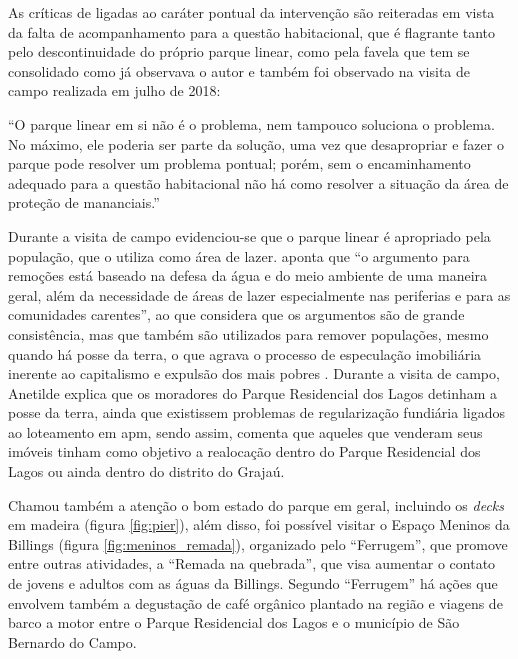	As críticas de  ligadas ao caráter pontual da intervenção são reiteradas em vista da falta de acompanhamento para a questão habitacional, que é flagrante tanto pelo descontinuidade do próprio parque linear, como pela favela que tem se consolidado como já observava o autor e também foi observado na visita de campo realizada em julho de 2018:
	
	\begin{citacao}
		``O parque linear em si não é o problema, nem tampouco soluciona o problema. No máximo, ele poderia ser parte da solução, uma vez que desapropriar e fazer o parque pode resolver um problema pontual; porém, sem o encaminhamento adequado para a questão habitacional não há como resolver a situação da área de proteção de mananciais.''
	\end{citacao}
	
	Durante a visita de campo evidenciou-se que o parque linear é apropriado pela população, que o utiliza como área de lazer.  aponta que ``o argumento para remoções está baseado na defesa da água e do meio ambiente de uma maneira geral, além da necessidade de áreas de lazer especialmente nas periferias e para as comunidades carentes'', ao que considera que os argumentos são de grande consistência, mas que também são utilizados para remover populações, mesmo quando há posse da terra, o que agrava o processo de especulação imobiliária inerente ao capitalismo e expulsão dos mais pobres \cite[p.118]{Silva2016}. Durante a visita de campo, Anetilde explica que os moradores do Parque Residencial dos Lagos detinham a posse da terra, ainda que existissem problemas de regularização fundiária ligados ao loteamento em \glsdesc{apm}, sendo assim, comenta que aqueles que venderam seus imóveis tinham como objetivo a realocação dentro do Parque Residencial dos Lagos ou ainda dentro do distrito do Grajaú.
	
	Chamou também a atenção o bom estado do parque em geral, incluindo os \textit{decks} em madeira (figura \ref{fig:pier}), além disso, foi possível visitar o Espaço Meninos da Billings (figura \ref{fig:meninos_remada}), organizado pelo ``Ferrugem'', que promove entre outras atividades, a ``Remada na quebrada'', que visa aumentar o contato de jovens e adultos com as águas da Billings. Segundo ``Ferrugem'' há ações que envolvem também a degustação de café orgânico plantado na região e viagens de barco a motor entre o Parque Residencial dos Lagos e o município de São Bernardo do Campo.

